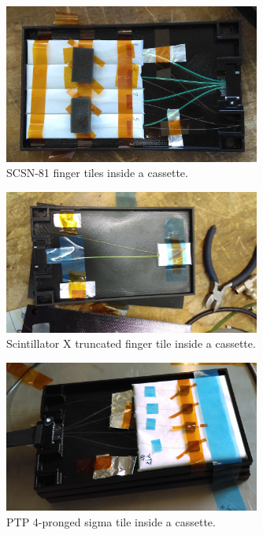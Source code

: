 \begin{figure}[hbtp]
\begin{center}
\includegraphics[width=0.75\textwidth]{figures/fingertile}
\caption{SCSN-81 finger tiles inside a cassette.}
\label{fig:fingertile}
\end{center}
\end{figure}

\begin{figure}[hbtp]
\begin{center}
\includegraphics[width=0.75\textwidth]{figures/scintXtile}
\caption{Scintillator X truncated finger tile inside a cassette.}
\label{fig:scintXtile}
\end{center}
\end{figure}

\begin{figure}[hbtp]
\begin{center}
\includegraphics[width=0.75\textwidth]{figures/PTPtile}
\caption{PTP 4-pronged sigma tile inside a cassette.}
\label{fig:PTPtile}
\end{center}
\end{figure}

